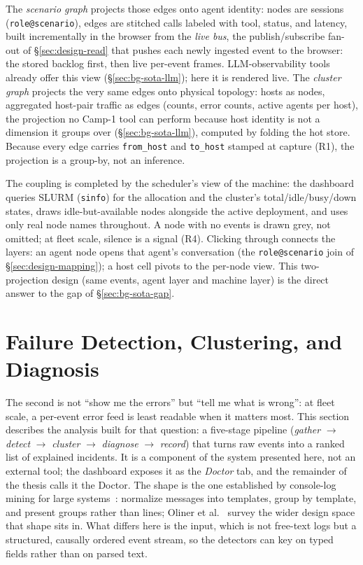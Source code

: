The \emph{scenario graph} projects those edges onto agent identity: nodes
are sessions (\texttt{role@scenario}), edges are stitched calls labeled
with tool, status, and latency, built incrementally in the browser from the
\emph{live bus}, the publish/subscribe fan-out of
\S\ref{sec:design-read} that pushes each newly ingested event to the
browser: the stored backlog first, then live per-event frames.
LLM-observability tools already offer this view
(\S\ref{sec:bg-sota-llm}); here it is rendered live. The \emph{cluster graph} projects
the very same edges onto physical topology: hosts as nodes, aggregated
host-pair traffic as edges (counts, error counts, active agents per host),
the projection no Camp-1 tool can perform because host identity is not a
dimension it groups over (\S\ref{sec:bg-sota-llm}),
computed by folding the hot store. Because every edge carries
\texttt{from\_host} and \texttt{to\_host} stamped at capture (R1), the
projection is a group-by, not an inference.

The coupling is completed by the scheduler's view of the machine: the
dashboard queries SLURM (\texttt{sinfo}) for the allocation and the
cluster's total/idle/busy/down states, draws idle-but-available nodes
alongside the active deployment, and uses only real node names throughout.
A node with no events is drawn grey, not omitted; at fleet scale,
silence is a signal (R4). Clicking through connects the layers: an agent
node opens that agent's conversation (the \texttt{role@scenario} join of
\S\ref{sec:design-mapping}); a host cell pivots to the per-node view. This
two-projection design (same events, agent layer and machine layer) is
the direct answer to the gap of \S\ref{sec:bg-sota-gap}.

\section{Failure Detection, Clustering, and Diagnosis}
\label{sec:analytics-doctor}

The second is not ``show me the errors'' but ``tell me what
is wrong'': at fleet scale, a per-event error feed is least readable
when it matters most. This section describes the analysis built for that
question: a five-stage pipeline
(\emph{gather} $\to$ \emph{detect} $\to$ \emph{cluster} $\to$
\emph{diagnose} $\to$ \emph{record}) that turns raw events into a
ranked list of explained incidents. It is a component of the system
presented here, not an external tool; the dashboard exposes it as the
\emph{Doctor} tab, and the remainder of the thesis calls it the Doctor.
The shape is the one established by
console-log mining for large systems~\cite{xu2009console}: normalize
messages into templates, group by template, and present groups rather than
lines; Oliner et al.~\cite{oliner2012loganalysis} survey the wider design
space that shape sits in. What differs here is the input, which is not free-text logs but a
structured, causally ordered event stream, so the detectors can key on
typed fields rather than on parsed text.

